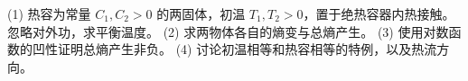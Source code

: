 (1) 热容为常量 \(C_1,C_2>0\) 的两固体，初温 \(T_1,T_2>0\)，置于绝热容器内热接触。忽略对外功，求平衡温度。
(2) 求两物体各自的熵变与总熵产生。
(3) 使用对数函数的凹性证明总熵产生非负。
(4) 讨论初温相等和热容相等的特例，以及热流方向。
